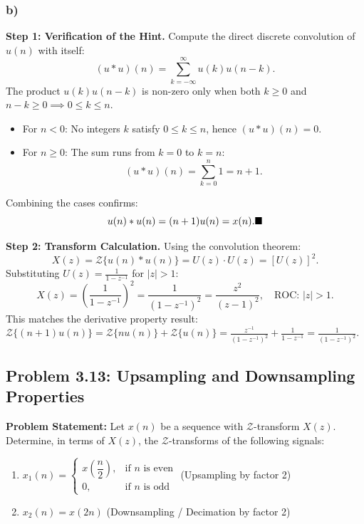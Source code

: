 \documentclass[12pt,a4paper]{article}
\begin{document}
\subsubsection*{b)}
\textbf{Step 1: Verification of the Hint.} Compute the direct discrete convolution of $u(n)$ with itself:
\begin{equation}
    (u * u)(n) = \sum_{k=-\infty}^{\infty} u(k) u(n - k).
\end{equation}
The product $u(k)u(n-k)$ is non-zero only when both $k \ge 0$ and $n - k \ge 0 \implies 0 \le k \le n$.
\begin{itemize}
    \item For $n < 0$: No integers $k$ satisfy $0 \le k \le n$, hence $(u * u)(n) = 0$.
    \item For $n \ge 0$: The sum runs from $k = 0$ to $k = n$:
    \begin{equation}
        (u * u)(n) = \sum_{k=0}^{n} 1 = n + 1.
    \end{equation}
\end{itemize}
Combining the cases confirms:
\begin{equation}
    u(n) * u(n) = (n + 1)u(n) = x(n). \hfill \blacksquare
\end{equation}

\textbf{Step 2: Transform Calculation.}
Using the convolution theorem:
\begin{equation}
    X(z) = \mathcal{Z}\{u(n) * u(n)\} = U(z) \cdot U(z) = [U(z)]^2.
\end{equation}
Substituting $U(z) = \frac{1}{1 - z^{-1}}$ for $|z| > 1$:
\begin{equation}
    X(z) = \left( \frac{1}{1 - z^{-1}} \right)^2 = \frac{1}{(1 - z^{-1})^2} = \frac{z^2}{(z - 1)^2}, \quad \text{ROC: } |z| > 1.
\end{equation}
This matches the derivative property result: $\mathcal{Z}\{(n+1)u(n)\} = \mathcal{Z}\{n u(n)\} + \mathcal{Z}\{u(n)\} = \frac{z^{-1}}{(1 - z^{-1})^2} + \frac{1}{1 - z^{-1}} = \frac{1}{(1 - z^{-1})^2}$.

\subsection{Problem 3.13: Upsampling and Downsampling Properties}
\textbf{Problem Statement:} Let $x(n)$ be a sequence with $\mathcal{Z}$-transform $X(z)$. Determine, in terms of $X(z)$, the $\mathcal{Z}$-transforms of the following signals:
\begin{enumerate}[label=(\alph*)]
    \item $x_1(n) = \begin{cases} x\left(\dfrac{n}{2}\right), & \text{if } n \text{ is even} \\ 0, & \text{if } n \text{ is odd} \end{cases}$ \quad (Upsampling by factor 2)
    \item $x_2(n) = x(2n)$ \quad (Downsampling / Decimation by factor 2)
\end{enumerate}
\end{document}

